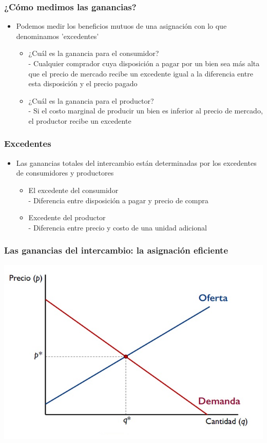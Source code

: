 \documentclass{beamer}
\begin{document}
\begin{frame}
\frametitle{¿Cómo medimos las ganancias?}
\begin{itemize}
    \item Podemos medir los beneficios mutuos de una asignación con lo que denominamos 'excedentes' 
    \begin{itemize}
        \item ¿Cuál es la ganancia para el consumidor? \\
        - Cualquier comprador cuya disposición a pagar por un bien sea más alta que el precio de mercado recibe un excedente igual a la diferencia entre esta disposición y el precio pagado
        \item ¿Cuál es la ganancia para el productor? \\
        - Si el costo marginal de producir un bien es inferior al precio de mercado, el productor recibe un excedente
    \end{itemize}
    \end{itemize}
\end{frame}

\begin{frame}
\frametitle{Excedentes}
\begin{itemize}
    \item Las ganancias totales del intercambio están determinadas por los excedentes de consumidores y productores
    \begin{itemize}
        \item El excedente del consumidor \\ - Diferencia entre disposición a pagar y precio de compra
        \item Excedente del productor \\ - Diferencia entre precio y costo de una unidad adicional
    \end{itemize}
    \end{itemize}
\end{frame}

\begin{frame}
\frametitle{Las ganancias del intercambio: la asignación eficiente}
\includegraphics[scale=0.55]{../Figures/Tema_07.3_equilibrioofertademanda_0.jpg}
\end{frame} 
\end{document}
